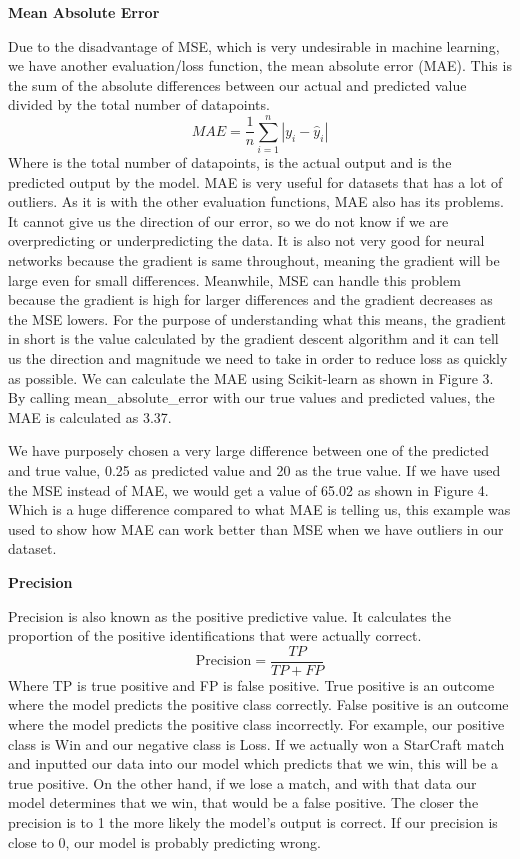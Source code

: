 \documentclass[a4paper,12pt]{report}
\newcommand{\msection}[1]{\noindent\textbf{#1}}
\begin{document}
 
\msection{Mean Absolute Error}

Due to the disadvantage of MSE, which is very undesirable in machine learning, we have another evaluation/loss function, the mean absolute error (MAE). This is the sum of the absolute differences between our actual and predicted value divided by the total number of datapoints.
$$MAE=\frac{1}{n}\sum_{i=1}^n|y_i-\hat{y}_i|$$
Where  is the total number of datapoints,  is the actual output and  is the predicted output by the model. MAE is very useful for datasets that has a lot of outliers. As it is with the other evaluation functions, MAE also has its problems. It cannot give us the direction of our error, so we do not know if we are overpredicting or underpredicting the data. It is also not very good for neural networks because the gradient is same throughout, meaning the gradient will be large even for small differences. Meanwhile, MSE can handle this problem because the gradient is high for larger differences and the gradient decreases as the MSE lowers. For the purpose of understanding what this means, the gradient in short is the value calculated by the gradient descent algorithm and it can tell us the direction and magnitude we need to take in order to reduce loss as quickly as possible. We can calculate the MAE using Scikit-learn as shown in Figure 3. By calling mean\_absolute\_error with our true values and predicted values, the MAE is calculated as 3.37.


We have purposely chosen a very large difference between one of the predicted and true value, 0.25 as predicted value and 20 as the true value. If  we have used the MSE instead of MAE, we would get a value of 65.02 as shown in Figure 4. Which is a huge difference compared to what MAE is telling us, this example was used to show how MAE can work better than MSE when we have outliers in our dataset.

 
\msection{Precision}

Precision is also known as the positive predictive value. It calculates the proportion of the positive identifications that were actually correct.
$$\text{Precision}=\frac{TP}{TP+FP}$$
Where TP  is true positive and FP is false positive. True positive is an outcome where the model predicts the positive class correctly. False positive is an outcome where the model predicts the positive class incorrectly. For example, our positive class is Win and our negative class is Loss. If we actually won a StarCraft match and inputted our data into our model which predicts that we win, this will be a true positive. On the other hand, if we lose a match, and with that data our model determines that we win, that would be a false positive. The closer the precision is to 1 the more likely the model’s output is correct. If our precision is close to 0, our model is probably predicting wrong.
 
\end{document}
